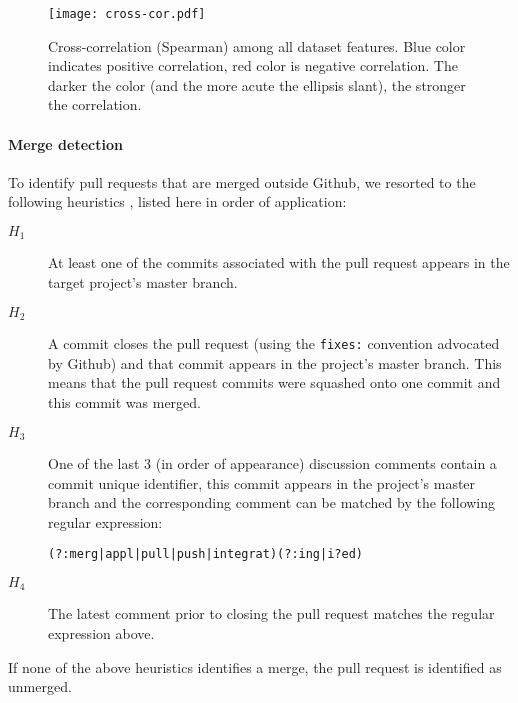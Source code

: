 \documentclass{sig-alternate}
\begin{document}
\begin{figure}
  \begin{center}
    \texttt{[image: cross-cor.pdf]}
  \end{center}
  \caption{Cross-correlation (Spearman) among all dataset features. Blue color indicates positive correlation, red color is negative correlation. The darker
  the color (and the more acute the ellipsis slant), the stronger the correlation.}
  \label{fig:features}
\end{figure}



\paragraph*{Merge detection}
To identify pull requests that are merged outside Github, we resorted to
the following heuristics , listed here in order of application:

\begin{description}

  \item[$H_1$] At least one of the commits associated with the pull request appears in the target project's master branch.

  \item[$H_2$] A commit closes the pull request (using the \texttt{fixes:}
    convention advocated by Github) and that commit appears in the project's
    master branch.  This means that the pull request commits were squashed onto
    one commit and this commit was merged.

  \item[$H_3$] One of the last 3 (in order of appearance) discussion comments
    contain a commit unique identifier, this commit appears in the project's
    master branch and the corresponding comment can be matched by the following
    regular expression:

    \begin{small}
    \texttt{(?:merg|appl|pull|push|integrat)(?:ing|i?ed)}
    \end{small}

  \item[$H_4$] The latest comment prior to closing the pull request matches the
    regular expression above.

\end{description}

If none of the above heuristics identifies a merge, the pull request is
identified as unmerged.
\end{document}
